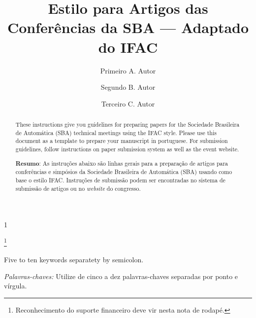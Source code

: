 \documentclass[a4paper]{ifacconf}
\def\portugues{1}
\def\portugues{0}
\begin{document}
	
	
\if\portugues1

% 
	
\begin{frontmatter}

\title{Estilo para Artigos das Conferências da SBA --- Adaptado do  IFAC} 

\thanks[footnoteinfo]{Reconhecimento do suporte financeiro deve vir nesta nota de rodapé.}


\author[First]{Primeiro A. Autor} 
\author[Second]{Segundo B. Autor} 
\author[Third]{Terceiro C. Autor}

\address[First]{Faculdade de Engenharia Elétrica, Universidade do Triângulo, MG, (e-mail: autor1@faceg@univt.br).}
\address[Second]{Faculdade de Engenharia de Controle \& Automação, Universidade do Futuro, RJ (e-mail: autor2@feca.unifutu.rj)}
\address[Third]{Electrical Engineering Department, 
   Seoul National University, Seoul, Korea, (e-mail: author3@snu.ac.kr)}


\renewcommand{\abstractname}{{\bf Abstract:~}}
\begin{abstract}                %
These instructions give you guidelines for preparing papers for the Sociedade Brasileira de Automática (SBA) technical meetings using the IFAC style. Please use this document as a template to prepare your manuscript in portuguese. For submission guidelines, follow instructions on paper submission system as well as the event website.

\vskip 1mm%
{\noindent \bf Resumo}:  As instruções abaixo são linhas gerais para a preparação de artigos para conferências e simpósios da Sociedade Brasileira de Automática (SBA) usando como base o estilo IFAC. Instruções de submissão podem ser encontradas no sistema de submissão de artigos ou no {\em website} do congresso.
\end{abstract}



\begin{keyword}
Five to ten keywords separatety by semicolon. 

\vskip 1mm%
{\noindent\it Palavras-chaves:} Utilize de cinco a dez palavras-chaves separadas por ponto e vírgula.
\end{keyword}




\end{frontmatter}
\end{document}
